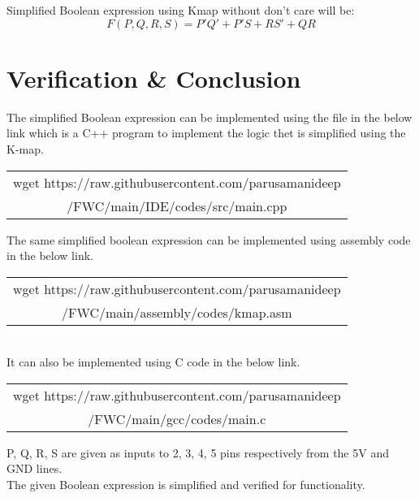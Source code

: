 \documentclass[journal,12pt,twocolumn]{IEEEtran}
\begin{document}
Simplified Boolean expression using Kmap without don't care will be:
$$F(P,Q,R,S) = P'Q' + P'S + RS' + QR$$

\section{Verification \& Conclusion}
The simplified Boolean expression can be implemented using the file in the below link which is a C++ program to implement the logic thet is simplified using the K-map.
\vspace{10pt}
\begin{tabular}{|c|}
    \hline
wget https://raw.githubusercontent.com/parusamanideep
\\/FWC/main/IDE/codes/src/main.cpp
     \\ \hline
\end{tabular}

\vspace{4pt}

 The same simplified boolean expression can be implemented using assembly code in the below link.
\vspace{10pt}
\begin{tabular}{|c|}
    \hline
wget https://raw.githubusercontent.com/parusamanideep
\\/FWC/main/assembly/codes/kmap.asm
     \\ \hline
\end{tabular}
\\
It can also be implemented using C code in the below link.

\vspace{5pt}
\begin{tabular}{|c|}
    \hline
wget https://raw.githubusercontent.com/parusamanideep
\\/FWC/main/gcc/codes/main.c
     \\ \hline
\end{tabular}
\bigskip

 P, Q, R, S are given as inputs to 2, 3, 4, 5 pins respectively from the 5V and GND lines.
\\The given Boolean expression is simplified and verified for functionality.
\end{document}
